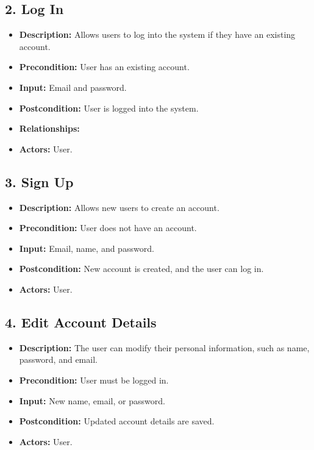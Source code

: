 \documentclass{article}
\begin{document}
\subsection*{2. Log In}
\begin{itemize}[left=0pt]
    \item \textbf{Description:} Allows users to log into the system if they have an existing account.
    \item \textbf{Precondition:} User has an existing account.
    \item \textbf{Input:} Email and password.
    \item \textbf{Postcondition:} User is logged into the system.
    \item \textbf{Relationships:}  
    \item \textbf{Actors:} User.
\end{itemize}

\subsection*{3. Sign Up}
\begin{itemize}[left=0pt]
    \item \textbf{Description:} Allows new users to create an account.
    \item \textbf{Precondition:} User does not have an account.
    \item \textbf{Input:} Email, name, and password.
    \item \textbf{Postcondition:} New account is created, and the user can log in.
    \item \textbf{Actors:} User.
\end{itemize}

\subsection*{4. Edit Account Details}
\begin{itemize}[left=0pt]
    \item \textbf{Description:} The user can modify their personal information, such as name, password, and email.
    \item \textbf{Precondition:} User must be logged in.
    \item \textbf{Input:} New name, email, or password.
    \item \textbf{Postcondition:} Updated account details are saved.
    \item \textbf{Actors:} User.
\end{itemize}
\end{document}
